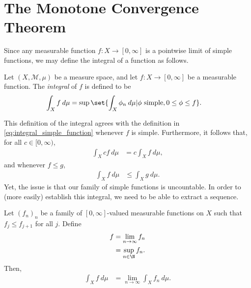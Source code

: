 \documentclass[10pt]{mypackage}
\begin{document}
\section{The Monotone Convergence Theorem}%
Since any measurable function $f\colon X\rightarrow [0,\infty]$ is a pointwise limit of simple functions, we may define the integral of a function as follows.
\begin{definition}
  Let $\left( X,\mathcal{M},\mu \right)$ be a measure space, and let $f\colon X\rightarrow [0,\infty]$ be a measurable function. The \textit{integral} of $f$ is defined to be
  \begin{align*}
    \int_{X}^{} f\:d\mu &= \sup\set{ \int_{X}^{} \phi_n\:d\mu | \phi\text{ simple},0\leq \phi \leq f}.
  \end{align*}
\end{definition}
This definition of the integral agrees with the definition in \eqref{eq:integral_simple_function} whenever $f$ is simple. Furthermore, it follows that, for all $c\in [0,\infty)$,
\begin{align*}
  \int_{X}^{} cf\:d\mu &= c \int_{X}^{} f\:d\mu,
\end{align*}
and whenever $f\leq g$,
\begin{align*}
  \int_{X}^{} f\:d\mu &\leq \int_{X}^{} g\:d\mu.
\end{align*}
Yet, the issue is that our family of simple functions is uncountable. In order to (more easily) establish this integral, we need to be able to extract a sequence.
\begin{theorem}
  Let $\left( f_n \right)_n$ be a family of $[0,\infty]$-valued measurable functions on $X$ such that $f_j\leq f_{j+1}$ for all $j$. Define 
  \begin{align*}
    f &= \lim_{n\rightarrow\infty}f_n\\
      &= \sup_{n\in \N} f_n.
  \end{align*}
  Then,
  \begin{align*}
    \int_{X}^{} f\:d\mu &= \lim_{n\rightarrow\infty} \int_{X}^{} f_n\:d\mu.
  \end{align*}
\end{theorem}
\end{document}
